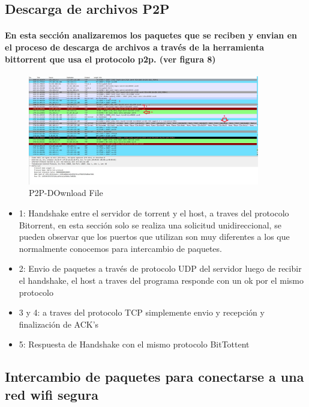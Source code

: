 \documentclass[letterpaper]{article}
\begin{document}
\subsection{Descarga de archivos P2P}
\paragraph{En esta sección analizaremos los paquetes que se reciben y envian en el proceso de descarga de archivos a través de la herramienta bittorrent que usa el protocolo p2p. (ver figura 8)}


\begin{figure}[h]
	\includegraphics[width=0.9\textwidth]{img/p2p-1.jpg}
	\caption{P2P-DOwnload File}
	\label{figura 8}
\end{figure}

\begin{itemize}
				
\item{1: Handshake entre el servidor de torrent y el host, a traves del protocolo Bitorrent, en esta sección solo se realiza una solicitud unidireccional, se pueden observar que los puertos que utilizan son muy diferentes a los que normalmente conocemos para intercambio de paquetes. }
\item{2: Envio de paquetes a través de protocolo UDP del servidor luego de recibir el handshake, el host a traves del programa responde con un ok por el mismo protocolo }
\item{3 y 4: a traves del protocolo TCP simplemente envio y recepción y finalización de ACK's}
\item{5: Respuesta de Handshake con el mismo protocolo BitTottent}

			\end{itemize}


\subsection{Intercambio de paquetes para conectarse a una red wifi segura}
\end{document}
